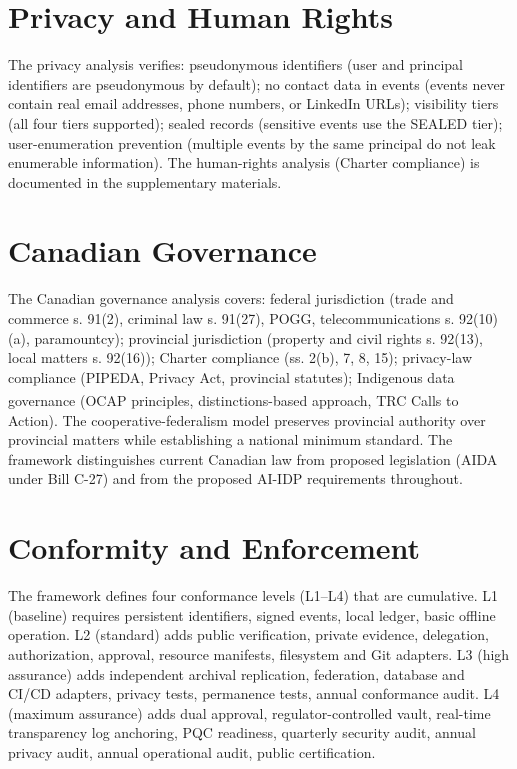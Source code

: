 \documentclass[11pt,a4paper]{article}
\begin{document}
\section{Privacy and Human Rights}
\label{sec:privacy}

The privacy analysis verifies: pseudonymous identifiers (user and principal identifiers are pseudonymous by default); no contact data in events (events never contain real email addresses, phone numbers, or LinkedIn URLs); visibility tiers (all four tiers supported); sealed records (sensitive events use the SEALED tier); user-enumeration prevention (multiple events by the same principal do not leak enumerable information). The human-rights analysis (Charter compliance) is documented in the supplementary materials.

\section{Canadian Governance}
\label{sec:canadian-governance}

The Canadian governance analysis covers: federal jurisdiction (trade and commerce s. 91(2), criminal law s. 91(27), POGG, telecommunications s. 92(10)(a), paramountcy); provincial jurisdiction (property and civil rights s. 92(13), local matters s. 92(16)); Charter compliance (ss. 2(b), 7, 8, 15); privacy-law compliance (PIPEDA, Privacy Act, provincial statutes); Indigenous data governance (OCAP\textsuperscript{\textregistered} principles, distinctions-based approach, TRC Calls to Action). The cooperative-federalism model preserves provincial authority over provincial matters while establishing a national minimum standard. The framework distinguishes current Canadian law from proposed legislation (AIDA under Bill C-27) and from the proposed AI-IDP requirements throughout.

\section{Conformity and Enforcement}
\label{sec:conformity-enforcement}

The framework defines four conformance levels (L1--L4) that are cumulative. L1 (baseline) requires persistent identifiers, signed events, local ledger, basic offline operation. L2 (standard) adds public verification, private evidence, delegation, authorization, approval, resource manifests, filesystem and Git adapters. L3 (high assurance) adds independent archival replication, federation, database and CI/CD adapters, privacy tests, permanence tests, annual conformance audit. L4 (maximum assurance) adds dual approval, regulator-controlled vault, real-time transparency log anchoring, PQC readiness, quarterly security audit, annual privacy audit, annual operational audit, public certification.
\end{document}
